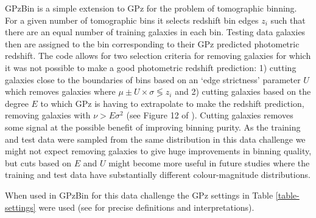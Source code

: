 \documentclass[twocolumn,twocolappendix]{aastex63}
\begin{document}
GPzBin is a simple extension to GPz for the problem of tomographic binning. For
a given number of tomographic bins it selects redshift bin edges $z_{i}$ such
that there are an equal number of training galaxies in each bin. Testing data
galaxies then are assigned to the bin corresponding to their GPz predicted
photometric redshift. The code allows for two selection criteria for removing
galaxies for which it was not possible to make a good photometric redshift
prediction: 1) cutting galaxies close to the boundaries of bins based on an
`edge strictness' parameter $U$ which removes galaxies where $\mu\pm U \times
\sigma \lessgtr z_i$ and 2) cutting galaxies based on the degree $E$ to which
GPz is having to extrapolate to make the redshift prediction, removing galaxies
with $\nu>E\sigma^2$ (see Figure 12 of \cite{Hatfield2020}). Cutting galaxies
removes some signal at the possible benefit of improving binning purity. As the
training and test data were sampled from the same distribution in this data
challenge we might not expect removing galaxies to give huge improvements in
binning quality, but cuts based on $E$ and $U$ might become more useful in
future studies where the training and test data have substantially different
colour-magnitude distributions.

When used in GPzBin for this data challenge the GPz settings
in Table \ref{table-settings} were used (see
\cite{Almosallam2016a,Almosallam2016b} for precise definitions and
interpretations).

\end{document}
